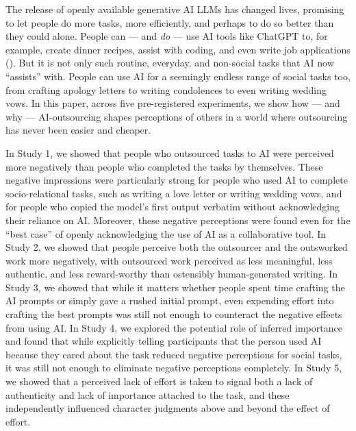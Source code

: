 \documentclass[
  man,
  floatsintext,
  longtable,
  nolmodern,
  notxfonts,
  notimes,
  colorlinks=true,linkcolor=blue,citecolor=blue,urlcolor=blue]{apa7}
\begin{document}
The release of openly available generative AI LLMs has changed lives,
promising to let people do more tasks, more efficiently, and perhaps to
do so better than they could alone. People can --- and \emph{do} --- use
AI tools like ChatGPT to, for example, create dinner recipes, assist
with coding, and even write job applications
(). But it is not only such routine, everyday, and
non-social tasks that AI now ``assists'' with. People can use AI for a
seemingly endless range of social tasks too, from crafting apology
letters to writing condolences to even writing wedding vows. In this
paper, across five pre-registered experiments, we show how --- and why
--- AI-outsourcing shapes perceptions of others in a world where
outsourcing has never been easier and cheaper.

In Study 1, we showed that people who outsourced tasks to AI were
perceived more negatively than people who completed the tasks by
themselves. These negative impressions were particularly strong for
people who used AI to complete socio-relational tasks, such as writing a
love letter or writing wedding vows, and for people who copied the
model's first output verbatim without acknowledging their reliance on
AI. Moreover, these negative perceptions were found even for the ``best
case'' of openly acknowledging the use of AI as a collaborative tool. In
Study 2, we showed that people perceive both the outsourcer and the
outsworked work more negatively, with outsourced work perceived as less
meaningful, less authentic, and less reward-worthy than ostensibly
human-generated writing. In Study 3, we showed that while it matters
whether people spent time crafting the AI prompts or simply gave a
rushed initial prompt, even expending effort into crafting the best
prompts was still not enough to counteract the negative effects from
using AI. In Study 4, we explored the potential role of inferred
importance and found that while explicitly telling participants that the
person used AI because they cared about the task reduced negative
perceptions for social tasks, it was still not enough to eliminate
negative perceptions completely. In Study 5, we showed that a perceived
lack of effort is taken to signal both a lack of authenticity and lack
of importance attached to the task, and these independently influenced
character judgments above and beyond the effect of effort.
\end{document}
